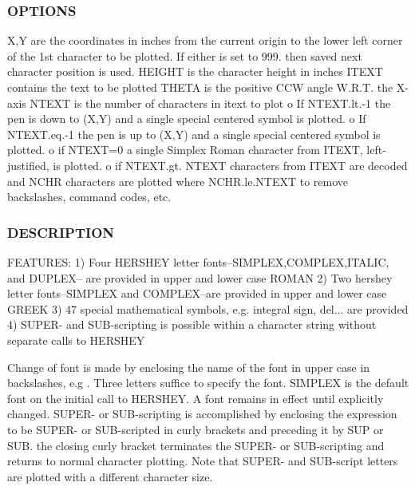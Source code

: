 \subsubsection*{O\+P\+T\+I\+O\+NS}

X,Y are the coordinates in inches from the current origin to the lower left corner of the 1st character to be plotted. If either is set to 999. then saved next character position is used. H\+E\+I\+G\+HT is the character height in inches I\+T\+E\+XT contains the text to be plotted T\+H\+E\+TA is the positive C\+CW angle W.\+R.\+T. the X-\/axis N\+T\+E\+XT is the number of characters in itext to plot o If N\+T\+E\+X\+T.\+lt.-\/1 the pen is down to (X,Y) and a single special centered symbol is plotted. o If N\+T\+E\+X\+T.\+eq.-\/1 the pen is up to (X,Y) and a single special centered symbol is plotted. o if N\+T\+E\+XT=0 a single Simplex Roman character from I\+T\+E\+XT, left-\/justified, is plotted. o if N\+T\+E\+X\+T.\+gt. N\+T\+E\+XT characters from I\+T\+E\+XT are decoded and N\+C\+HR characters are plotted where N\+C\+H\+R.\+le.\+N\+T\+E\+XT to remove backslashes, command codes, etc. \subsubsection*{D\+E\+S\+C\+R\+I\+P\+T\+I\+ON}

F\+E\+A\+T\+U\+R\+ES\+: 1) Four H\+E\+R\+S\+H\+EY letter fonts--S\+I\+M\+P\+L\+EX,C\+O\+M\+P\+L\+EX,I\+T\+A\+L\+IC, and D\+U\+P\+L\+EX-- are provided in upper and lower case R\+O\+M\+AN 2) Two hershey letter fonts--S\+I\+M\+P\+L\+EX and C\+O\+M\+P\+L\+EX--are provided in upper and lower case G\+R\+E\+EK 3) 47 special mathematical symbols, e.\+g. integral sign, del... are provided 4) S\+U\+P\+E\+R-\/ and S\+U\+B-\/scripting is possible within a character string without separate calls to H\+E\+R\+S\+H\+EY

Change of font is made by enclosing the name of the font in upper case in backslashes, e.\+g . Three letters suffice to specify the font. S\+I\+M\+P\+L\+EX is the default font on the initial call to H\+E\+R\+S\+H\+EY. A font remains in effect until explicitly changed. S\+U\+P\+E\+R-\/ or S\+U\+B-\/scripting is accomplished by enclosing the expression to be S\+U\+P\+E\+R-\/ or S\+U\+B-\/scripted in curly brackets and preceding it by S\+UP or S\+UB. the closing curly bracket terminates the S\+U\+P\+E\+R-\/ or S\+U\+B-\/scripting and returns to normal character plotting. Note that S\+U\+P\+E\+R-\/ and S\+U\+B-\/script letters are plotted with a different character size.

